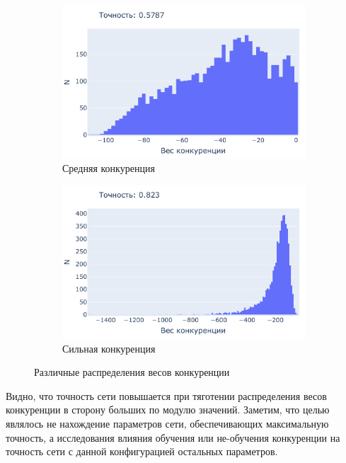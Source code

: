\documentclass[a4paper]{article}
\begin{document}
\begin{figure}[H]
\begin{subfigure}{0.45\textwidth}
    \includegraphics[width=\textwidth,keepaspectratio=true]{competition_distribution_medium_good_ru.pdf}
    \caption{Средняя конкуренция} 
\end{subfigure}
\begin{subfigure}{0.45\textwidth}
    \includegraphics[width=\textwidth,keepaspectratio=true]{competition_distribution_best_ru.pdf}
    \caption{Сильная конкуренция}
\end{subfigure}
\caption{Различные распределения весов конкуренции}
\label{fig:competition_distributions}
\end{figure}

Видно, что точность сети повышается при тяготении распределения весов конкуренции в сторону больших по модулю значений. Заметим, что целью являлось не нахождение параметров сети, обеспечивающих максимальную точность, а исследования влияния обучения или не-обучения конкуренции на точность сети с данной конфигурацией остальных параметров.
\end{document}
